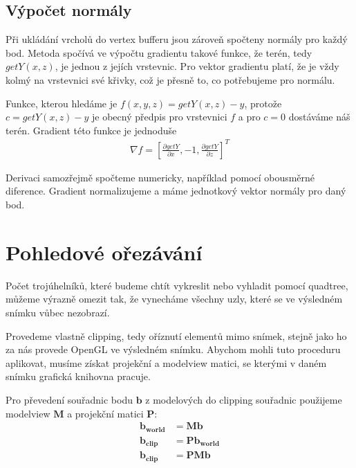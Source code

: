 \documentclass{zcu_sp}
\begin{document}
\subsection{Výpočet normály}
Při ukládání vrcholů do vertex bufferu jsou zároveň spočteny normály pro každý
bod. Metoda spočívá ve výpočtu gradientu takové funkce, že terén, tedy $getY(x,
z)$, je jednou z jejích vrstevnic. Pro vektor gradientu platí, že je vždy kolmý
na vrstevnici své křivky, což je přesně to, co potřebujeme pro normálu.

Funkce, kterou hledáme je $f(x, y, z) = getY(x, z) - y$, protože $c = getY(x,
z) - y$ je obecný předpis pro vrstevnici $f$ a pro $c = 0$ dostáváme náš terén. 
Gradient této funkce je jednoduše
\begin{align*}
\nabla f = \left[ \frac{\partial getY}{\partial x}, -1, \frac{\partial getY}{\partial z} \right]^T
\end{align*}

Derivaci samozřejmě spočteme numericky, například pomocí obousměrné diference.
Gradient normalizujeme a máme jednotkový vektor normály pro daný bod.


\section{Pohledové ořezávání}
Počet trojúhelníků, které budeme chtít vykreslit nebo vyhladit pomocí quadtree,
můžeme výrazně omezit tak, že vynecháme všechny uzly, které se ve výsledném
snímku vůbec nezobrazí.

Provedeme vlastně clipping, tedy oříznutí elementů mimo snímek, stejně jako ho
za nás provede OpenGL ve výsledném snímku. Abychom mohli tuto proceduru
aplikovat, musíme získat projekční a modelview matici, se kterými v daném
snímku grafická knihovna pracuje.

Pro převedení souřadnic bodu $\mathbf{b}$ z modelových do clipping souřadnic
použijeme modelview $\mathbf{M}$ a projekční matici $\mathbf{P}$:
\begin{align*}
\mathbf{b_{world}} &= \mathbf{M} \mathbf{b} \\
\mathbf{b_{clip}} &= \mathbf{P} \mathbf{b_{world}} \\
\mathbf{b_{clip}} &= \mathbf{P} \mathbf{M} \mathbf{b} \\
\end{align*}
\end{document}
